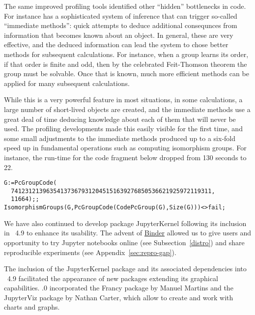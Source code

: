 The same improved profiling tools identified other
``hidden'' bottlenecks in \GAP code. For instance \GAP has a
sophisticated system of inference that can trigger 
so-called ``immediate methods'': quick attempts to deduce additional
consequnces from information that becomes known about an object.
In general, these are very effective, and the deduced information can
lead the system to chose better methods for subsequent
calculations. For instance, when a group learns its order, if that
order is finite and odd, then by the celebrated
Feit-Thomson theorem the group must be solvable. Once that
is known, much more efficient methods can be applied for many
subsequent calculations.

While this is a very powerful feature in most situations, in some
calculations, a large number of short-lived objects are created,
and the immediate methods use a great deal of time deducing knowledge
about each of them
that will never be used. The profiling developments made this 
easily visible for the first time, and some small adjustments to the
immediate methods produced up to a six-fold speed up in fundamental
operations such as computing isomorphism groups. For instance, the
run-time for the code fragment below dropped from 130
seconds to 22.


{\Small
\begin{verbatim}
G:=PcGroupCode( 
  741231213963541373679312045151639276850536621925972119311,
  11664);;
IsomorphismGroups(G,PcGroupCode(CodePcGroup(G),Size(G)))<>fail;
\end{verbatim}
}


We have also continued to develop package {\sf JupyterKernel} following 
its inclusion in \GAP~4.9 to enhance its usability. The advent of
\href{https://mybinder.org/}{Binder} allowed us to give users and 
opportunity to try \GAP Jupyter notebooks online (see Subsection~\ref{distro})
and share reproducible \GAP experiments (see Appendix~\ref{sec:repro-gap}).

The inclusion of the {\sf JupyterKernel} package and its associated 
dependencies into \GAP~4.9 facilitated the appearance of new packages
extending its graphical capabilities. .0 incorporated 
the {\sf Francy} package \cite{Francy} by Manuel Martins and
the {\sf JupyterViz} package \cite{JupyterViz} by Nathan Carter, which
allow to create and work with charts and graphs.




